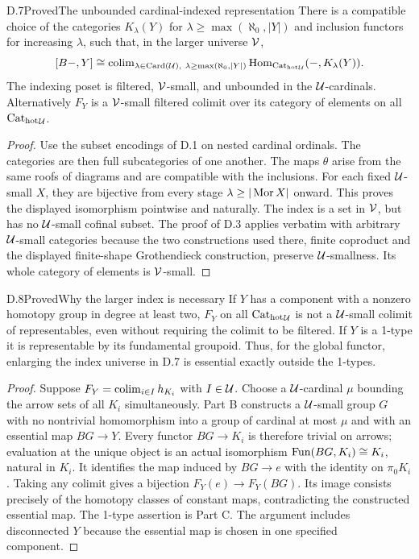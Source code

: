 \begin{claim}{D.7}{Proved}{The unbounded cardinal-indexed representation}
There is a compatible choice of the categories $K_\lambda(Y)$ for $\lambda\geq\max(\aleph_0,|Y|)$ and inclusion functors for increasing $\lambda$, such that, in the larger universe $\mathcal V$,
\[
 [B-,Y]\cong\colim_{\lambda\in\operatorname{Card}(\U),\ \lambda\geq\max(\aleph_0,|Y|)}
 \Hom_{\Cathot_\U}(-,K_\lambda(Y)).
\]
The indexing poset is filtered, $\mathcal V$-small, and unbounded in the $\mathcal U$-cardinals. Alternatively $F_Y$ is a $\mathcal V$-small filtered colimit over its category of elements on all ${\mathrm{Cat}_{\mathrm{hot}}}_\mathcal U$.
\end{claim}
\begin{proof}
Use the subset encodings of D.1 on nested cardinal ordinals. The categories are then full subcategories of one another. The maps $\theta$ arise from the same roofs of diagrams and are compatible with the inclusions. For each fixed $\mathcal U$-small $X$, they are bijective from every stage $\lambda\geq|\operatorname{Mor} X|$ onward. This proves the displayed isomorphism pointwise and naturally. The index is a set in $\mathcal V$, but has no $\mathcal U$-small cofinal subset. The proof of D.3 applies verbatim with arbitrary $\mathcal U$-small categories because the two constructions used there, finite coproduct and the displayed finite-shape Grothendieck construction, preserve $\mathcal U$-smallness. Its whole category of elements is $\mathcal V$-small.
\end{proof}

\begin{claim}{D.8}{Proved}{Why the larger index is necessary}
If $Y$ has a component with a nonzero homotopy group in degree at least two, $F_Y$ on all ${\mathrm{Cat}_{\mathrm{hot}}}_\mathcal U$ is not a $\mathcal U$-small colimit of representables, even without requiring the colimit to be filtered. If $Y$ is a 1-type it is representable by its fundamental groupoid. Thus, for the global functor, enlarging the index universe in D.7 is essential exactly outside the 1-types.
\end{claim}
\begin{proof}
Suppose $F_Y=\operatorname{colim}_{i\in I}h_{K_i}$ with $I\in\mathcal U$. Choose a $\mathcal U$-cardinal $\mu$ bounding the arrow sets of all $K_i$ simultaneously. Part B constructs a $\mathcal U$-small group $G$ with no nontrivial homomorphism into a group of cardinal at most $\mu$ and with an essential map $BG\to Y$. Every functor $BG\to K_i$ is therefore trivial on arrows; evaluation at the unique object is an actual isomorphism $\operatorname{Fun}(BG,K_i)\cong K_i$, natural in $K_i$. It identifies the map induced by $BG\to e$ with the identity on $\pi_0K_i$. Taking any colimit gives a bijection $F_Y(e)\to F_Y(BG)$. Its image consists precisely of the homotopy classes of constant maps, contradicting the constructed essential map. The 1-type assertion is Part C. The argument includes disconnected $Y$ because the essential map is chosen in one specified component.
\end{proof}
